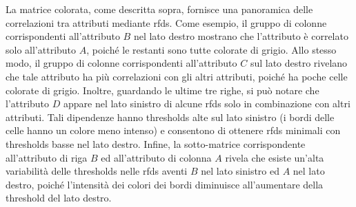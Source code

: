 La matrice colorata, come descritta sopra, fornisce una panoramica delle correlazioni tra attributi mediante \acrlong{rfds}. Come esempio, il gruppo di colonne corrispondenti all'attributo $B$ nel lato destro mostrano che l'attributo \`{e} correlato solo all'attributo $A$, poich\'{e} le restanti sono tutte colorate di grigio. Allo stesso modo, il gruppo di colonne corrispondenti all'attributo $C$ sul lato destro rivelano che tale attributo ha pi\`{u} correlazioni con gli altri attributi, poich\'{e} ha poche celle colorate di grigio. Inoltre, guardando le ultime tre righe, si pu\`{o} notare che l'attributo $D$ appare nel lato sinistro di alcune \acrlong{rfds} solo in combinazione con altri attributi. Tali dipendenze hanno thresholds alte sul lato sinistro (i bordi delle celle hanno un colore meno intenso) e consentono di ottenere \acrlong{rfds} minimali con thresholds basse nel lato destro. Infine, la sotto-matrice corrispondente all'attributo di riga $B$ ed all'attributo di colonna $A$ rivela che esiste un'alta variabilit\`{a} delle thresholds nelle \acrlong{rfds} aventi $B$ nel lato sinistro ed $A$ nel lato destro, poich\'{e} l'intensit\`{a} dei colori dei bordi diminuisce all'aumentare della threshold del lato destro.

